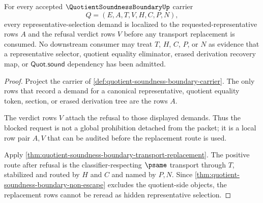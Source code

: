 \begin{theorem}
\label{thm:quotient-soundness-boundary-refusal-locality}
For every accepted $\QuotientSoundnessBoundaryUp$ carrier
$$
Q=(E,A,T,V,H,C,P,N),
$$
every representative-selection demand is localized to the requested-representative rows $A$ and the refusal verdict rows $V$ before any transport replacement is consumed. No downstream consumer may treat $T$, $H$, $C$, $P$, or $N$ as evidence that a representative selector, quotient equality eliminator, erased derivation recovery map, or $\mathsf{Quot.sound}$ dependency has been admitted.
\end{theorem}
\begin{proof}
Project the carrier of \autoref{def:quotient-soundness-boundary-carrier}. The only rows that record a demand for a canonical representative, quotient equality token, section, or erased derivation tree are the rows $A$.

The verdict rows $V$ attach the refusal to those displayed demands. Thus the blocked request is not a global prohibition detached from the packet; it is a local row pair $A,V$ that can be audited before the replacement route is used.

Apply \autoref{thm:quotient-soundness-boundary-transport-replacement}. The positive route after refusal is the classifier-respecting $\psame$ transport through $T$, stabilized and routed by $H$ and $C$ and named by $P,N$. Since \autoref{thm:quotient-soundness-boundary-non-escape} excludes the quotient-side objects, the replacement rows cannot be reread as hidden representative selection.
\end{proof}

